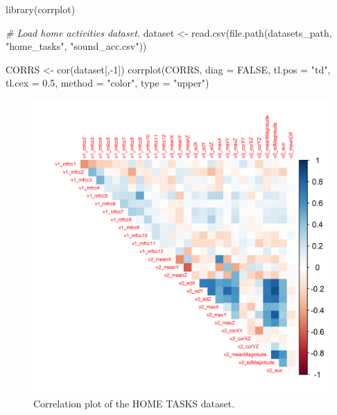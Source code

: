 \documentclass[
  11pt,
]{krantz}
\newenvironment{Shaded}{\begin{snugshade}}{\end{snugshade}}
\newcommand{\AttributeTok}[1]{\textcolor[rgb]{0.61,0.61,0.61}{#1}}
\newcommand{\CommentTok}[1]{\textcolor[rgb]{0.37,0.37,0.37}{\textit{#1}}}
\newcommand{\ConstantTok}[1]{\textcolor[rgb]{0,0,0}{#1}}
\newcommand{\DecValTok}[1]{\textcolor[rgb]{0.06,0.06,0.06}{#1}}
\newcommand{\FloatTok}[1]{\textcolor[rgb]{0.06,0.06,0.06}{#1}}
\newcommand{\FunctionTok}[1]{\textcolor[rgb]{0,0,0}{#1}}
\newcommand{\NormalTok}[1]{#1}
\newcommand{\OtherTok}[1]{\textcolor[rgb]{0.37,0.37,0.37}{#1}}
\newcommand{\SpecialCharTok}[1]{\textcolor[rgb]{0,0,0}{#1}}
\newcommand{\StringTok}[1]{\textcolor[rgb]{0.5,0.5,0.5}{#1}}
\begin{document}
\begin{Shaded}
\begin{Highlighting}[]
\FunctionTok{library}\NormalTok{(corrplot)}

\CommentTok{\# Load home activities dataset.}
\NormalTok{dataset }\OtherTok{\textless{}{-}} \FunctionTok{read.csv}\NormalTok{(}\FunctionTok{file.path}\NormalTok{(datasets\_path,}
                              \StringTok{"home\_tasks"}\NormalTok{,}
                              \StringTok{"sound\_acc.csv"}\NormalTok{))}

\NormalTok{CORRS }\OtherTok{\textless{}{-}} \FunctionTok{cor}\NormalTok{(dataset[,}\SpecialCharTok{{-}}\DecValTok{1}\NormalTok{])}
\FunctionTok{corrplot}\NormalTok{(CORRS, }\AttributeTok{diag =} \ConstantTok{FALSE}\NormalTok{, }\AttributeTok{tl.pos =} \StringTok{"td"}\NormalTok{, }\AttributeTok{tl.cex =} \FloatTok{0.5}\NormalTok{,}
         \AttributeTok{method =} \StringTok{"color"}\NormalTok{, }\AttributeTok{type =} \StringTok{"upper"}\NormalTok{)}
\end{Highlighting}
\end{Shaded}

\begin{figure}

{\centering \includegraphics[width=1\linewidth]{images/corrhome} 

}

\caption{Correlation plot of the HOME TASKS dataset.}\label{fig:corrhome}
\end{figure}
\end{document}
